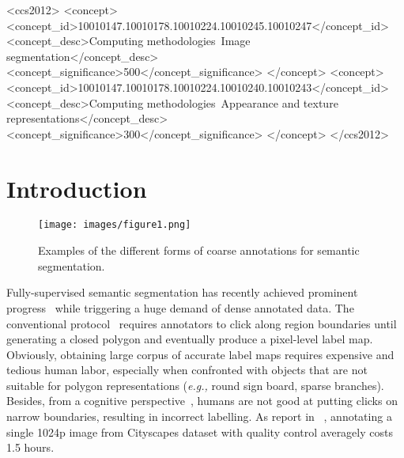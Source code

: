 \documentclass[sigconf]{acmart}
\begin{document}
\begin{CCSXML}
	<ccs2012>
	<concept>
	<concept_id>10010147.10010178.10010224.10010245.10010247</concept_id>
	<concept_desc>Computing methodologies~Image segmentation</concept_desc>
	<concept_significance>500</concept_significance>
	</concept>
	<concept>
	<concept_id>10010147.10010178.10010224.10010240.10010243</concept_id>
	<concept_desc>Computing methodologies~Appearance and texture representations</concept_desc>
	<concept_significance>300</concept_significance>
	</concept>
	</ccs2012>
\end{CCSXML}





\maketitle

\section{Introduction}
\begin{figure}[!htb]
	\centering
	\texttt{[image: images/figure1.png]}\\
	\caption{Examples of the different forms of coarse annotations for semantic segmentation. }
	\label{fig:example}
\end{figure}
Fully-supervised semantic segmentation has recently achieved prominent progress~\cite{DBLP:conf/cvpr/BertasiusTYS17,DBLP:conf/cvpr/LiLLLT17,fcn,deeplab,pspnet} while triggering a huge demand of dense annotated data. The conventional protocol~\cite{cityscapes,pascalvoc} requires annotators to click along region boundaries until generating a closed polygon and eventually produce a pixel-level label map. Obviously, obtaining large corpus of accurate label maps requires expensive and tedious human labor, especially when confronted with objects that are not suitable for polygon representations (\textit{e.g.,} round sign board, sparse branches). Besides, from a cognitive perspective~\cite{extreme}, humans are not good at putting clicks on narrow boundaries, resulting in incorrect labelling. As report in ~\cite{cityscapes}, annotating a single 1024p image from Cityscapes dataset with quality control averagely costs 1.5 hours.
\end{document}
